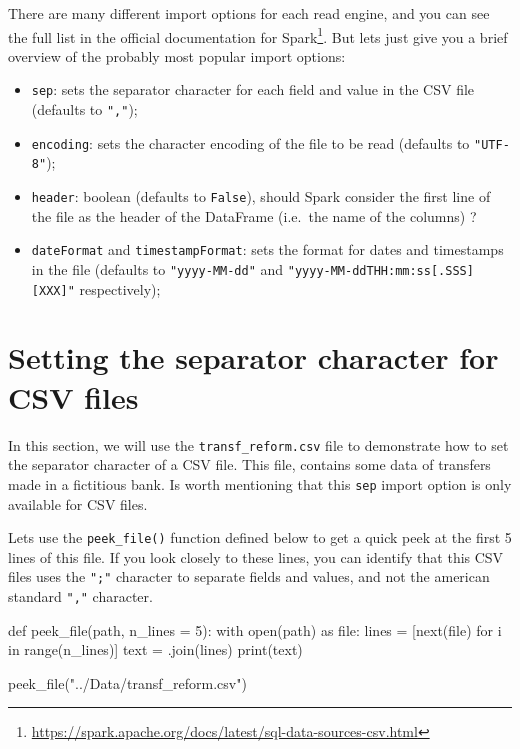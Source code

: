 \documentclass[
  11pt,
  letterpaper,
  DIV=11,
  numbers=noendperiod]{scrreprt}
\newenvironment{Shaded}{\begin{snugshade}}{\end{snugshade}}
\newcommand{\BuiltInTok}[1]{\textcolor[rgb]{0.00,0.23,0.31}{#1}}
\newcommand{\ControlFlowTok}[1]{\textcolor[rgb]{0.00,0.23,0.31}{#1}}
\newcommand{\DecValTok}[1]{\textcolor[rgb]{0.68,0.00,0.00}{#1}}
\newcommand{\ImportTok}[1]{\textcolor[rgb]{0.00,0.46,0.62}{#1}}
\newcommand{\KeywordTok}[1]{\textcolor[rgb]{0.00,0.23,0.31}{#1}}
\newcommand{\NormalTok}[1]{\textcolor[rgb]{0.00,0.23,0.31}{#1}}
\newcommand{\OperatorTok}[1]{\textcolor[rgb]{0.37,0.37,0.37}{#1}}
\newcommand{\StringTok}[1]{\textcolor[rgb]{0.13,0.47,0.30}{#1}}
\providecommand{\tightlist}{%
  \setlength{\itemsep}{0pt}\setlength{\parskip}{0pt}}\usepackage{longtable,booktabs,array}
\begin{document}
There are many different import options for each read engine, and you
can see the full list in the official documentation for
Spark\footnote{\url{https://spark.apache.org/docs/latest/sql-data-sources-csv.html}}.
But lets just give you a brief overview of the probably most popular
import options:

\begin{itemize}
\tightlist
\item
  \texttt{sep}: sets the separator character for each field and value in
  the CSV file (defaults to \texttt{","});
\item
  \texttt{encoding}: sets the character encoding of the file to be read
  (defaults to \texttt{"UTF-8"});
\item
  \texttt{header}: boolean (defaults to \texttt{False}), should Spark
  consider the first line of the file as the header of the DataFrame
  (i.e.~the name of the columns) ?
\item
  \texttt{dateFormat} and \texttt{timestampFormat}: sets the format for
  dates and timestamps in the file (defaults to \texttt{"yyyy-MM-dd"}
  and
  \texttt{"yyyy-MM-dd\textquotesingle{}T\textquotesingle{}HH:mm:ss{[}.SSS{]}{[}XXX{]}"}
  respectively);
\end{itemize}

\hypertarget{setting-the-separator-character-for-csv-files}{%
\section{Setting the separator character for CSV
files}\label{setting-the-separator-character-for-csv-files}}

In this section, we will use the \texttt{transf\_reform.csv} file to
demonstrate how to set the separator character of a CSV file. This file,
contains some data of transfers made in a fictitious bank. Is worth
mentioning that this \texttt{sep} import option is only available for
CSV files.

Lets use the \texttt{peek\_file()} function defined below to get a quick
peek at the first 5 lines of this file. If you look closely to these
lines, you can identify that this CSV files uses the \texttt{";"}
character to separate fields and values, and not the american standard
\texttt{","} character.

\begin{Shaded}
\begin{Highlighting}[]
\KeywordTok{def}\NormalTok{ peek\_file(path, n\_lines }\OperatorTok{=} \DecValTok{5}\NormalTok{):}
  \ControlFlowTok{with} \BuiltInTok{open}\NormalTok{(path) }\ImportTok{as} \BuiltInTok{file}\NormalTok{:}
\NormalTok{    lines }\OperatorTok{=}\NormalTok{ [}\BuiltInTok{next}\NormalTok{(}\BuiltInTok{file}\NormalTok{) }\ControlFlowTok{for}\NormalTok{ i }\KeywordTok{in} \BuiltInTok{range}\NormalTok{(n\_lines)]}
\NormalTok{  text }\OperatorTok{=} \StringTok{\textquotesingle{}\textquotesingle{}}\NormalTok{.join(lines)}
  \BuiltInTok{print}\NormalTok{(text)}
  
\NormalTok{peek\_file(}\StringTok{"../Data/transf\_reform.csv"}\NormalTok{)}
\end{Highlighting}
\end{Shaded}
\end{document}
